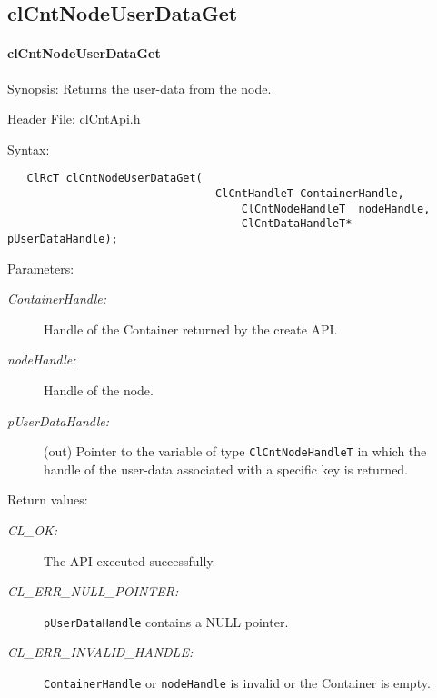 \subsection{clCntNodeUserDataGet}
\hypertarget{pagecnt117}{}\paragraph{cl\-Cnt\-Node\-User\-Data\-Get}\label{pagecnt117}
\begin{Desc}
\item[Synopsis:]Returns the user-data from the node.\end{Desc}
\begin{Desc}
\item[Header File:]clCntApi.h\end{Desc}
\begin{Desc}
\item[Syntax:]

\footnotesize\begin{verbatim}   ClRcT clCntNodeUserDataGet(
              		      		ClCntHandleT ContainerHandle,
                              		ClCntNodeHandleT  nodeHandle,
                      	      		ClCntDataHandleT* pUserDataHandle);
\end{verbatim}
\normalsize
\end{Desc}
\begin{Desc}
\item[Parameters:]
\begin{description}
\item[{\em Container\-Handle:}]Handle of the Container returned by the create API. 
\item[{\em node\-Handle:}]Handle of the node. 
\item[{\em p\-User\-Data\-Handle:}](out) Pointer to the variable of type {\tt{ClCntNodeHandleT}} in which the handle of the user-data associated with a
specific key is returned.\end{description}
\end{Desc}
\begin{Desc}
\item[Return values:]
\begin{description}
\item[{\em CL\_\-OK:}]The API executed successfully. 
\item[{\em CL\_\-ERR\_\-NULL\_\-POINTER:}]{\tt{pUserDataHandle}} contains a NULL pointer. 
\item[{\em CL\_\-ERR\_\-INVALID\_\-HANDLE:}]{\tt{ContainerHandle}} or {\tt{nodeHandle}} is invalid or the Container is empty.
\end{description}
\end{Desc}
